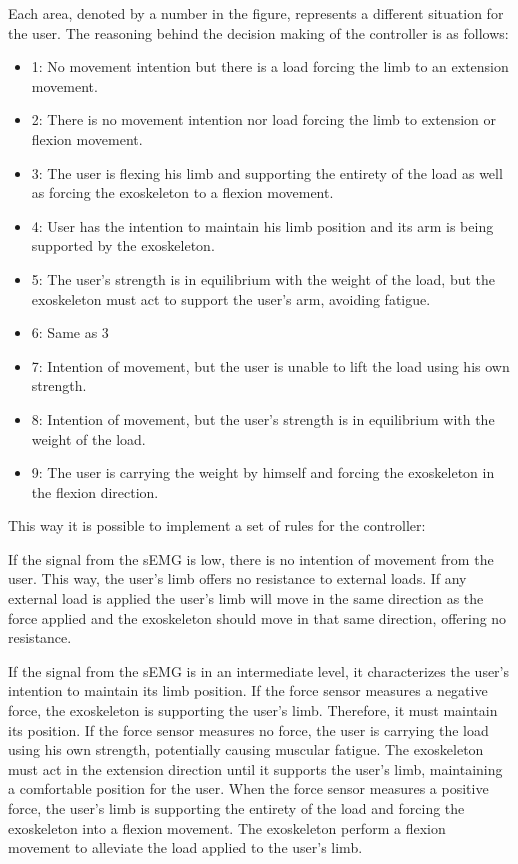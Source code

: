 Each area, denoted by a number in the figure, represents a different situation for the user. The reasoning behind the decision making of the controller is as follows:

\begin{itemize}
\item 1: No movement intention but there is a load forcing the limb to an extension movement.
\item 2: There is no movement intention nor load forcing the limb to extension or flexion movement.
\item 3: The user is flexing his limb and supporting the entirety of the load as well as forcing the exoskeleton to a flexion movement.
\item 4: User has the intention to maintain his limb position and its arm is being supported by the exoskeleton.
\item 5: The user's strength is in equilibrium with the weight of the load, but the exoskeleton must act to support the user's arm, avoiding fatigue.
\item 6: Same as 3
\item 7: Intention of movement, but the user is unable to lift the load using his own strength.
\item 8: Intention of movement, but the user's strength is in equilibrium with the weight of the load.
\item 9: The user is carrying the weight by himself and forcing the exoskeleton in the flexion direction.
\end{itemize}

This way it is possible to implement a set of rules for the controller:

If the signal from the sEMG is low, there is no intention of movement from the user. This way, the user's limb offers no resistance to external loads. If any external load is applied the user's limb will move in the same direction as the force applied and the exoskeleton should move in that same direction, offering no resistance.

If the signal from the sEMG is in an intermediate level, it characterizes the user's intention to maintain its limb position. If the force sensor measures a negative force, the exoskeleton is supporting the user's limb. Therefore, it must maintain its position. If the force sensor measures no force, the user is carrying the load using his own strength, potentially causing muscular fatigue. The exoskeleton must act in the extension direction until it supports the user's limb, maintaining a comfortable position for the user. When the force sensor measures a positive force, the user's limb is supporting the entirety of the load and forcing the exoskeleton into a flexion movement. The exoskeleton perform a flexion movement to alleviate the load applied to the user's limb.

